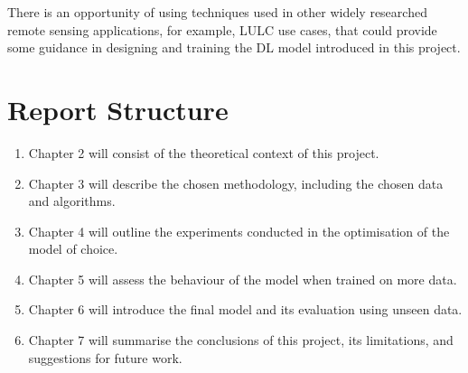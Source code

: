 There is an opportunity of using techniques used in other widely researched remote sensing applications, for example, \gls{LULC} use cases, that could provide some guidance in designing and training the DL model introduced in this project.

\section{Report Structure} \label{report_struct}
\begin{enumerate}
    \item Chapter 2 will consist of the theoretical context of this project. 
    \item Chapter 3 will describe the chosen methodology, including the chosen data and algorithms. 
    \item Chapter 4 will outline the experiments conducted in the optimisation of the model of choice.
    \item Chapter 5 will assess the behaviour of the model when trained on more data.
    \item Chapter 6 will introduce the final model and its evaluation using unseen data.
    \item Chapter 7 will summarise the conclusions of this project, its limitations, and suggestions for future work.
\end{enumerate}